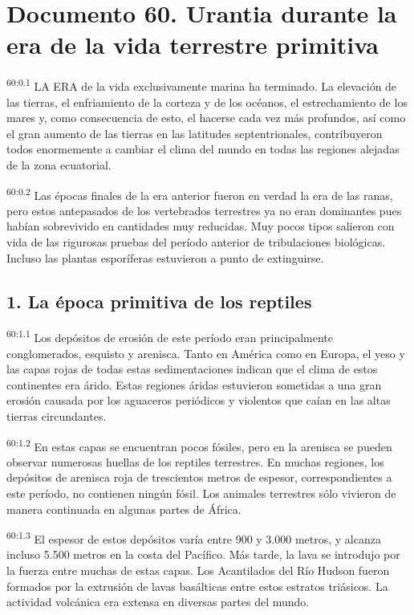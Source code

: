 \chapter{Documento 60. Urantia durante la era de la vida terrestre primitiva}
\par
\textsuperscript{60:0.1} LA ERA de la vida exclusivamente marina ha terminado. La elevación de las tierras, el enfriamiento de la corteza y de los océanos, el estrechamiento de los mares y, como consecuencia de esto, el hacerse cada vez más profundos, así como el gran aumento de las tierras en las latitudes septentrionales, contribuyeron todos enormemente a cambiar el clima del mundo en todas las regiones alejadas de la zona ecuatorial.

\par
\textsuperscript{60:0.2} Las épocas finales de la era anterior fueron en verdad la era de las ranas, pero estos antepasados de los vertebrados terrestres ya no eran dominantes pues habían sobrevivido en cantidades muy reducidas. Muy pocos tipos salieron con vida de las rigurosas pruebas del período anterior de tribulaciones biológicas. Incluso las plantas esporíferas estuvieron a punto de extinguirse.

\section*{1. La época primitiva de los reptiles}
\par
\textsuperscript{60:1.1} Los depósitos de erosión de este período eran principalmente conglomerados, esquisto y arenisca. Tanto en América como en Europa, el yeso y las capas rojas de todas estas sedimentaciones indican que el clima de estos continentes era árido. Estas regiones áridas estuvieron sometidas a una gran erosión causada por los aguaceros periódicos y violentos que caían en las altas tierras circundantes.

\par
\textsuperscript{60:1.2} En estas capas se encuentran pocos fósiles, pero en la arenisca se pueden observar numerosas huellas de los reptiles terrestres. En muchas regiones, los depósitos de arenisca roja de trescientos metros de espesor, correspondientes a este período, no contienen ningún fósil. Los animales terrestres sólo vivieron de manera continuada en algunas partes de África.

\par
\textsuperscript{60:1.3} El espesor de estos depósitos varía entre 900 y 3.000 metros, y alcanza incluso 5.500 metros en la costa del Pacífico. Más tarde, la lava se introdujo por la fuerza entre muchas de estas capas. Los Acantilados del Río Hudson fueron formados por la extrusión de lavas basálticas entre estos estratos triásicos. La actividad volcánica era extensa en diversas partes del mundo.

